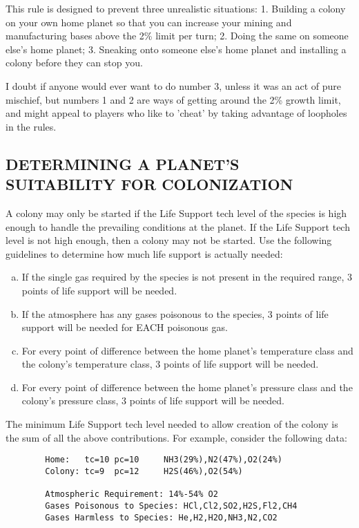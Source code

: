 \documentclass[10pt,titlepage]{article}
\begin{document}
This rule is designed to prevent three unrealistic situations:  1. Building
a colony on your own home planet so that you can increase your mining and
manufacturing bases above the 2\% limit per turn;  2. Doing the same on someone
else's home planet;  3. Sneaking onto someone else's home planet and installing
a colony before they can stop you.

I doubt if anyone would ever want to do number 3, unless it was an act of pure
mischief, but numbers 1 and 2 are ways of getting around the 2\% growth limit,
and might appeal to players who like to 'cheat' by taking advantage of
loopholes in the rules.


\subsection{DETERMINING A PLANET'S SUITABILITY FOR COLONIZATION}
\label{sec:determiningsuitability}


A colony may only be started if the Life Support tech level of the species is
high enough to handle the prevailing conditions at the planet.  If the Life
Support tech level is not high enough, then a colony may not be started.  Use
the following guidelines to determine how much life support is actually needed:
\begin{enumerate}[a.] 
     \item If the single gas required by the species is not present in
	the required range, 3 points of life support will be needed.

     \item If the atmosphere has any gases poisonous to the species,
	3 points of life support will be needed for EACH poisonous gas.

     \item For every point of difference between the home planet's temperature
	class and the colony's temperature class, 3 points of life support
	will be needed.

     \item For every point of difference between the home planet's pressure
	class and the colony's pressure class, 3 points of life support
	will be needed.
\end{enumerate}
The minimum Life Support tech level needed to allow creation of the colony is
the sum of all the above contributions.  For example, consider the following
data:

\begin{verbatim}
        Home:   tc=10 pc=10     NH3(29%),N2(47%),O2(24%)
        Colony: tc=9  pc=12     H2S(46%),O2(54%)

        Atmospheric Requirement: 14%-54% O2
        Gases Poisonous to Species: HCl,Cl2,SO2,H2S,Fl2,CH4
        Gases Harmless to Species: He,H2,H2O,NH3,N2,CO2
\end{verbatim} 
\end{document}
